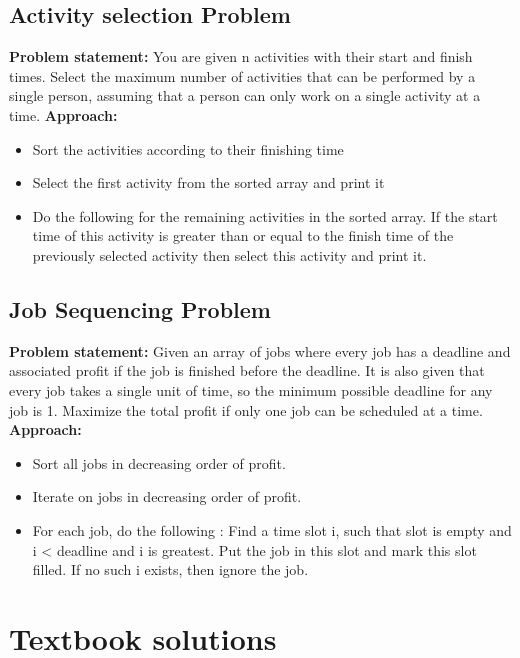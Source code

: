 \documentclass[11pt,letterpaper]{article}
\begin{document}
\subsection{Activity selection Problem}
\textbf{Problem statement: } You are given n activities with their start and finish times. Select the maximum number of activities that 
can be performed by a single person, assuming that a person can only work on a single activity at a time. \newline
\textbf{Approach: }
\begin{itemize}
	\item Sort the activities according to their finishing time 
	\item Select the first activity from the sorted array and print it 
	\item Do the following for the remaining activities in the sorted array. If the start time of this activity is greater than or equal to the finish time of the previously selected activity then select this activity and print it. 
\end{itemize}



\subsection{Job Sequencing Problem}
\textbf{Problem statement: } Given an array of jobs where every job has a deadline and associated profit if the job is finished before the deadline. It is also given that every job takes a single unit of time, so the minimum possible deadline for any job is 1. Maximize the total profit if only one job can be scheduled at a time. \newline
\textbf{Approach: }
\begin{itemize}
	\item Sort all jobs in decreasing order of profit.
	\item Iterate on jobs in decreasing order of profit.
	\item For each job, do the following : 
	\subitem Find a time slot i, such that slot is empty and i < deadline and i is greatest. Put the job in 
	this slot and mark this slot filled. 
	\subitem If no such i exists, then ignore the job. 
\end{itemize}


\section{Textbook solutions}
\end{document}
